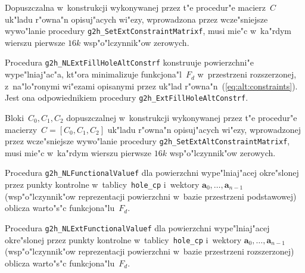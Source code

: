 Dopuszczalna w~konstrukcji wykonywanej przez t"e procedur"e
macierz~$C$ uk"ladu r"owna"n opisuj"acych wi"ezy, wprowadzona przez
wcze"sniejsze wywo"lanie procedury \texttt{g2h\_SetExtConstraintMatrixf},
musi mie"c w~ka"rdym wierszu pierwsze $16k$ wsp"o"lczynnik"ow zerowych.

\vspace{\bigskipamount}
Procedura \texttt{g2h\_NLExtFillHoleAltConstrf} konstruuje powierzchni"e
wype"lniaj"ac"a, kt"ora minimalizuje funkcjona"l~$F_d$ w~przestrzeni
rozszerzonej, z~na"lo"ronymi wi"ezami opisanymi przez uk"lad
r"owna"n~(\ref{eq:alt:constraints}). Jest ona odpowiednikiem
procedury \texttt{g2h\_ExtFillHoleAltConstrf}.

Bloki~$C_0,C_1,C_2$ dopuszczalnej w~konstrukcji wykonywanej przez t"e
procedur"e macierzy~$C=[C_0,C_1,C_2]$ uk"ladu r"owna"n opisuj"acych wi"ezy,
wprowadzonej przez wcze"sniejsze wywo"lanie procedury
\texttt{g2h\_SetExtAltConstraintMatrixf}, musi mie"c w~ka"rdym wierszu
pierwsze $16k$ wsp"o"lczynnik"ow zerowych.

\vspace{\bigskipamount}
Procedura \texttt{g2h\_NLFunctionalValuef} dla powierzchni wype"lniaj"acej
okre"slonej przez punkty kontrolne w~tablicy~\texttt{hole\_cp} i~wektory
$\bm{a}_0,\ldots,\bm{a}_{n-1}$ (wsp"o"lczynnik"ow reprezentacji powierzchni
w~bazie przestrzeni podstawowej) oblicza warto"s"c funkcjona"lu~$F_d$.

\vspace{\bigskipamount}
Procedura \texttt{g2h\_NLExtFunctionalValuef} dla powierzchni wype"lniaj"acej
okre"slonej przez punkty kontrolne w~tablicy~\texttt{hole\_cp} i~wektory
$\bm{a}_0,\ldots,\bm{a}_{n-1}$ (wsp"o"lczynnik"ow reprezentacji powierzchni
w~bazie przestrzeni rozszerzonej) oblicza warto"s"c funkcjona"lu~$F_d$.

